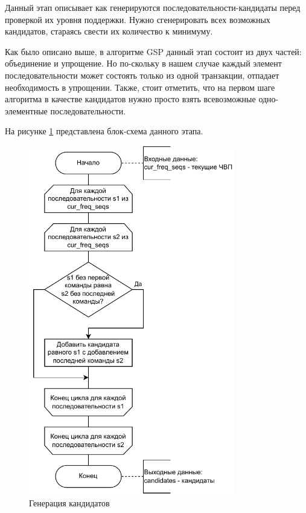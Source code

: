 Данный этап описывает как генерируются последовательности-кандидаты перед проверкой их уровня поддержки. Нужно сгенерировать всех возможных кандидатов, стараясь свести их количество к минимуму.

Как было описано выше, в алгоритме GSP данный этап состоит из двух частей: объединение и упрощение. Но по-скольку в нашем случае каждый элемент последовательности может состоять только из одной транзакции, отпадает необходимость в упрощении. Также, стоит отметить, что на первом шаге алгоритма в качестве кандидатов нужно просто взять всевозможные одно-элементные последовательности.

На рисунке \ref{generateCandidates} представлена блок-схема данного этапа.

%

\newpage
\begin{figure}[h!]
	\centering
	\includegraphics[width=0.8\textwidth]{inc/img/generateCandidates.drawio.pdf}
	\caption{Генерация кандидатов}
	\label{generateCandidates}
\end{figure}

